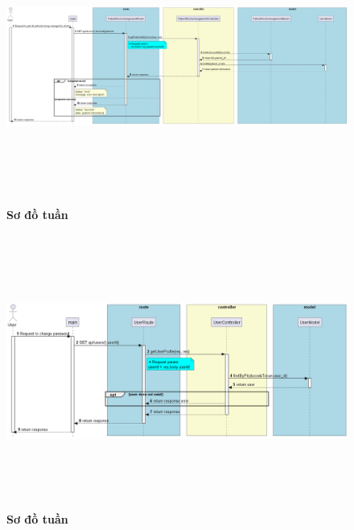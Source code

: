 \documentclass{article}%
\begin{document}
\begin{figure}[H]
  \centering
  \includegraphics[width=16cm,height=9cm]{Images/server/sequence/server/getPatientsByDoctor.png}
  \caption[Sơ đồ tuần tự ]{\bfseries \fontsize{12pt}{0pt}
  \selectfont Sơ đồ tuần }
  \label{hinh21} %
\end{figure}

\begin{figure}[H]
  \centering
  \includegraphics[width=16cm,height=9cm]{Images/server/sequence/server/getUserById.png}
  \caption[Sơ đồ tuần tự ]{\bfseries \fontsize{12pt}{0pt}
  \selectfont Sơ đồ tuần }
  \label{hinh21} %
\end{figure}
\end{document}
